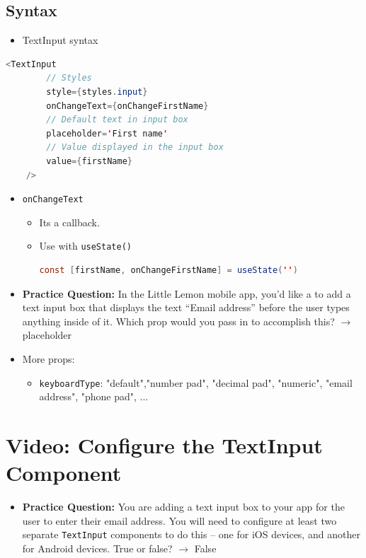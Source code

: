 \subsection{Syntax}
\begin{itemize}
    \item TextInput syntax
\end{itemize}
\begin{lstlisting}[language=Java, numbers=none]
    <TextInput
        // Styles
        style={styles.input}
        onChangeText={onChangeFirstName}
        // Default text in input box
        placeholder='First name'
        // Value displayed in the input box
        value={firstName}
    />
\end{lstlisting}
\begin{itemize}
    \item \texttt{onChangeText}
    \begin{itemize}
        \item Its a callback.
        \item Use with \texttt{useState()}
        \begin{lstlisting}[language=Java, numbers=none]
            const [firstName, onChangeFirstName] = useState('')
        \end{lstlisting}
    \end{itemize}
    
    \item \textbf{Practice Question:} In the Little Lemon mobile app, you’d like a to add a text input box that displays the text “Email address” before the user types anything inside of it. Which prop would you pass in to accomplish this?
    $\rightarrow$ placeholder 
\end{itemize}

\begin{itemize}
    \item More props:
    \begin{itemize}
        \item \texttt{keyboardType}: "default","number pad", "decimal pad", "numeric", "email address", "phone pad", ...
    \end{itemize}
\end{itemize}

\section{Video: Configure the TextInput Component}
\begin{itemize}
    \item \textbf{Practice Question:} You are adding a text input box to your app for the user to enter their email address. You will need to configure at least two separate \texttt{TextInput} components to do this – one for iOS devices, and another for Android devices. True or false?  
    $\rightarrow$ False 
\end{itemize}


